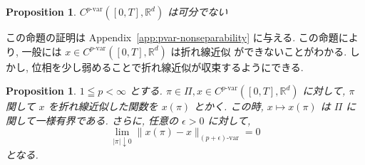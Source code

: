 \documentclass[11pt]{article}
\theoremstyle{breakstyle}
\newtheorem{proposition}[theorem]{Proposition}
\begin{document}
\begin{proposition}
    \label{prop:pvar-nonseparable}
    $C^{p\text{-var}}([0,T],\mathbb{R}^d)$ は可分でない
\end{proposition}
この命題の証明は Appendix~\ref{app:pvar-nonseparability} に与える. この命題により, 一般には $x\in C^{p\text{-var}}([0,T],\mathbb{R}^d)$ は折れ線近似
ができないことがわかる. しかし, 位相を少し弱めることで折れ線近似が収束するようにできる.
\begin{proposition}
    $1\leqq p<\infty$ とする. $\pi\in\Pi, x\in C^{p\text{-var}}([0,T],\mathbb{R}^d)$ に対して, $\pi$ 関して $x$ を折れ線近似した関数を $x(\pi)$ とかく.
    この時, $x\mapsto x(\pi)$ は $\Pi$ に関して一様有界である. 
    さらに, 任意の $\epsilon>0$ に対して, 
    \begin{equation*}
        \lim_{|\pi|\downarrow 0}\|x(\pi)-x\|_{(p+\epsilon)\text{-var}}=0
    \end{equation*}
    となる.
\end{proposition}
\end{document}

